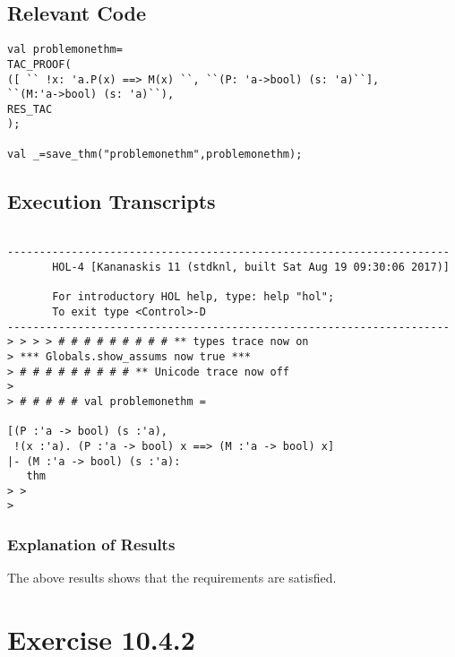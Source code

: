 \documentclass{report}
\begin{document}
\section{Relevant Code}
\label{sec:relevant-code-4}
 \lstset{frameround=fftt}
\begin{lstlisting}[frame=tRBL]
val problemonethm=
TAC_PROOF(
([ `` !x: 'a.P(x) ==> M(x) ``, ``(P: 'a->bool) (s: 'a)``],
``(M:'a->bool) (s: 'a)``),
RES_TAC
);

val _=save_thm("problemonethm",problemonethm);

\end{lstlisting}


\section{Execution Transcripts}
\label{sec:exec-transcr-4}

\setcounter{sessioncount}{0}
\begin{session}
  \begin{scriptsize}
\begin{verbatim}

---------------------------------------------------------------------
       HOL-4 [Kananaskis 11 (stdknl, built Sat Aug 19 09:30:06 2017)]

       For introductory HOL help, type: help "hol";
       To exit type <Control>-D
---------------------------------------------------------------------
> > > > # # # # # # # # # ** types trace now on
> *** Globals.show_assums now true ***
> # # # # # # # # # ** Unicode trace now off
> 
> # # # # # val problemonethm =
   
[(P :'a -> bool) (s :'a),
 !(x :'a). (P :'a -> bool) x ==> (M :'a -> bool) x]
|- (M :'a -> bool) (s :'a):
   thm
> > 
> 
\end{verbatim}
  \end{scriptsize}
\end{session}

\subsection{Explanation of Results}
\label{sec:explanation-results-4}
The above results shows that the requirements are satisfied.



 \chapter{Exercise 10.4.2}
 \label{cha:exercise-10.4.2}
  
\end{document}
